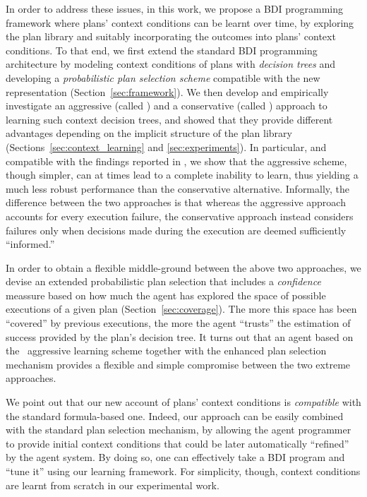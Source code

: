 In order to address these issues, in this work, we propose a BDI programming
framework where plans' context conditions can be learnt over time, by exploring
the plan library and suitably incorporating the outcomes into plans' context
conditions.
To that end, we first extend the standard BDI programming architecture by
modeling context conditions of plans with \emph{decision trees}
\cite{Mitchell97:ML} and developing a \emph{probabilistic plan selection scheme}
compatible with the new representation (Section~\ref{sec:framework}). %
We then  develop and empirically investigate an aggressive (called \CL) and a
conservative (called \BUL) approach to learning such context decision trees, and
showed that they provide different advantages depending on the implicit structure
of the plan library (Sections~\ref{sec:context_learning} and
\ref{sec:experiments}). In particular, and compatible with the findings reported
in \cite{APSS08}, we show that the aggressive scheme, though simpler, can at
times lead to a complete inability to learn, thus yielding a much less robust
performance than the conservative alternative.
Informally, the difference between the two approaches is that whereas the
aggressive approach accounts for every execution failure, the conservative
approach instead considers failures only when decisions made during the execution
are deemed sufficiently ``informed.''


In order to obtain a flexible middle-ground between the above two approaches, we
devise an extended probabilistic plan selection that includes a \emph{confidence}
meassure based on how much the agent has explored the space of possible
executions of a given plan (Section~\ref{sec:coverage}). The more this space has
been ``covered'' by previous executions, the more the agent ``trusts'' the
estimation of success provided by the plan's decision tree.
It turns out that an agent based on the \CL\ aggressive learning scheme together
with the enhanced plan selection mechanism provides a flexible and simple
compromise between the two extreme approaches.



We point out that our new account of plans' context conditions is
\emph{compatible} with the standard formula-based one.
Indeed, our approach can be easily combined with the standard plan selection
mechanism, by allowing the agent programmer to provide initial context conditions
that could be later automatically ``refined'' by the agent system. By doing so,
one can effectively take a BDI program and ``tune it'' using our learning
framework.
For simplicity, though, context conditions are learnt from scratch in our
experimental work.





